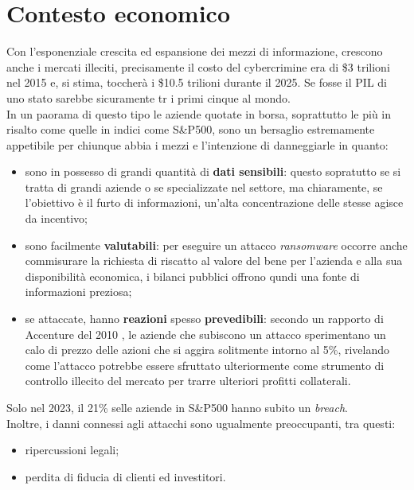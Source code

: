 \documentclass[12pt,a4paper,openright,twoside]{report}
\begin{document}
\section{Contesto economico}
Con l'esponenziale crescita ed espansione dei mezzi di informazione, crescono anche i mercati illeciti, precisamente il costo del cybercrimine era di \$3 trilioni nel 2015 e, si stima, toccher\`a i \$10.5 trilioni durante il 2025\cite{cybercrime_magazine}. Se fosse il PIL di uno stato sarebbe sicuramente tr i primi cinque al mondo.\\
In un paorama di questo tipo le aziende quotate in borsa, soprattutto le pi\`u in risalto come quelle in indici come S\&P500, sono un bersaglio estremamente appetibile per chiunque abbia i mezzi e l'intenzione di danneggiarle in quanto:
\begin{itemize}
  \setlength{\itemsep}{0pt}
  \setlength{\parskip}{0pt}       
  \renewcommand{\labelitemi}{\textbf{--}} 
  \item sono in possesso di grandi quantit\`a di \textbf{dati sensibili}: questo sopratutto se si tratta di grandi aziende o se specializzate nel settore, ma chiaramente, se l'obiettivo \`e il furto di informazioni, un'alta concentrazione delle stesse agisce da incentivo;
  \item sono facilmente \textbf{valutabili}: per eseguire un attacco \textit{ransomware} occorre anche commisurare la richiesta di riscatto al valore del bene per l'azienda e alla sua disponibilit\`a economica, i bilanci pubblici offrono qundi una fonte di informazioni  preziosa;
  \item se attaccate, hanno \textbf{reazioni} spesso \textbf{prevedibili}: secondo un rapporto di Accenture del 2010 \cite{accenture2010}, le aziende che subiscono un attacco sperimentano un calo di prezzo delle azioni che si aggira solitmente intorno al 5\%, rivelando come l'attacco potrebbe essere sfruttato ulteriormente come strumento di controllo illecito del mercato per trarre  ulteriori profitti collaterali.
\end{itemize}
Solo nel 2023, il 21\% selle aziende in S\&P500 hanno subito un \textit{breach}\cite{SecurityScorecard_SP500}.\\
Inoltre, i danni connessi agli attacchi sono ugualmente preoccupanti, tra questi:
\begin{itemize}
  \setlength{\itemsep}{0pt}   
  \setlength{\parskip}{0pt}       
  \renewcommand{\labelitemi}{\textbf{--}}  
  \item ripercussioni legali;
  \item perdita di fiducia di clienti ed investitori.
\end{itemize}
\end{document}
